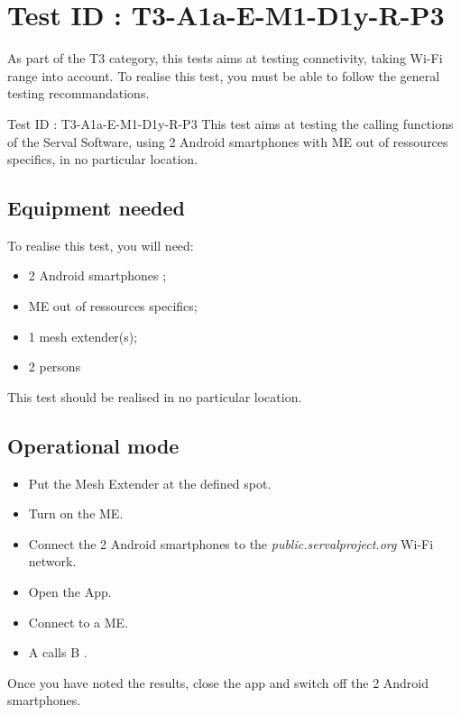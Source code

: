 \documentclass[oneside]{book}
\begin{document}
\section{Test ID : T3-A1a-E-M1-D1y-R-P3}
\begin{itshape}
As part of the T3 category, this tests aims at testing connetivity, taking Wi-Fi range into account.
To realise this test, you must be able to follow the general testing recommandations.
\end{itshape}
\newline
Test ID : T3-A1a-E-M1-D1y-R-P3
 This test aims at testing the calling functions of the Serval Software, using 2 Android smartphones with ME out of ressources specifics, in no particular location.
\subsection{Equipment needed} To realise this test, you will need:
\begin{itemize}
\item 2 Android smartphones ;
\item ME out of ressources specifics;
\item 1 mesh extender(s);
\item 2 persons
\end{itemize}
This test should be realised in no particular location.
\subsection{Operational mode} \begin{itemize}
\item Put the Mesh Extender at the defined spot.
\item Turn on the ME.
\item Connect the 2 Android smartphones to the \emph{public.servalproject.org} Wi-Fi network.
\item Open the App.
\item Connect to a ME.
\item A calls B .
\end{itemize}
Once you have noted the results, close the app and switch off the 2 Android smartphones.
\end{document}

